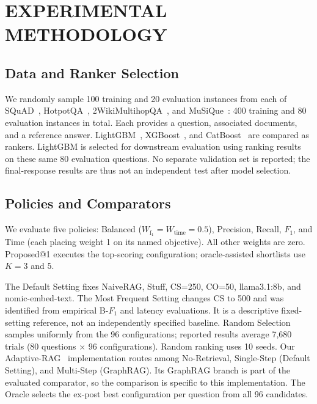 \section{\uppercase{Experimental Methodology}} \label{sec4}
\subsection{Data and Ranker Selection} \label{sec4.1}\label{sec4.2}
We randomly sample 100 training and 20 evaluation instances from each of SQuAD~\cite{rajpurkar16}, HotpotQA~\cite{yang18}, 2WikiMultihopQA~\cite{ho20}, and MuSiQue~\cite{trivedi22}: 400 training and 80 evaluation instances in total. Each provides a question, associated documents, and a reference answer. LightGBM~\cite{KeGuolin17}, XGBoost~\cite{ChenTianqi16}, and CatBoost~\cite{Prokhorenkova18} are compared as rankers. LightGBM is selected for downstream evaluation using ranking results on these same 80 evaluation questions. No separate validation set is reported; the final-response results are thus not an independent test after model selection.

\subsection{Policies and Comparators} \label{sec4.3}
We evaluate five policies: Balanced ($W_{\mathrm{f_1}}=W_{\mathrm{time}}=0.5$), Precision, Recall, $F_1$, and Time (each placing weight 1 on its named objective). All other weights are zero. Proposed@1 executes the top-scoring configuration; oracle-assisted shortlists use $K=3$ and $5$.

\label{sec4.5}
The Default Setting fixes NaiveRAG, Stuff, CS=250, CO=50, llama3.1:8b, and nomic-embed-text. The Most Frequent Setting changes CS to 500 and was identified from empirical B-$F_1$ and latency evaluations. It is a descriptive fixed-setting reference, not an independently specified baseline. Random Selection samples uniformly from the 96 configurations; reported results average 7,680 trials (80 questions $\times$ 96 configurations). Random ranking uses 10 seeds. Our Adaptive-RAG~\cite{Jeong24} implementation routes among No-Retrieval, Single-Step (Default Setting), and Multi-Step (GraphRAG). Its GraphRAG branch is part of the evaluated comparator, so the comparison is specific to this implementation. The Oracle selects the ex-post best configuration per question from all 96 candidates.

